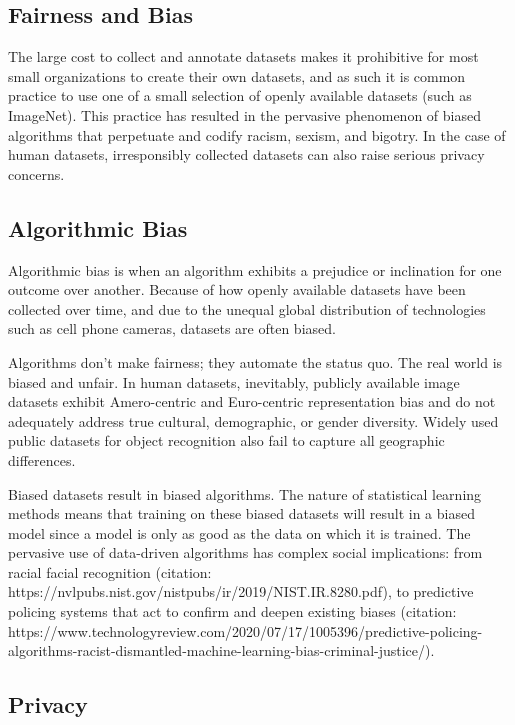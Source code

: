 \documentclass{article}
\begin{document}
\subsection{Fairness and Bias}

The large cost to collect and annotate datasets makes it prohibitive for most small organizations to create their own datasets, and as such it is common practice to use one of a small selection of openly available datasets (such as ImageNet). This practice has resulted in the pervasive phenomenon of biased algorithms that perpetuate and codify racism, sexism, and bigotry. In the case of human datasets, irresponsibly collected datasets can also raise serious privacy concerns. 

\subsection{Algorithmic Bias}

Algorithmic bias is when an algorithm exhibits a prejudice or inclination for one outcome over another. Because of how openly available datasets have been collected over time, and due to the unequal global distribution of technologies such as cell phone cameras, datasets are often biased. 

Algorithms don’t make fairness; they automate the status quo. The real world is biased and unfair. In human datasets, inevitably, publicly available image datasets exhibit Amero-centric and Euro-centric representation bias and do not adequately address true cultural, demographic, or gender diversity\cite{shankar2017classification}. Widely used public datasets for object recognition also fail to capture all geographic differences\cite{DBLP:journals/corr/abs-1906-02659}. 

Biased datasets result in biased algorithms. The nature of statistical learning methods means that training on these biased datasets will result in a biased model since a model is only as good as the data on which it is trained. The pervasive use of data-driven algorithms has complex social implications: from racial facial recognition (citation: https://nvlpubs.nist.gov/nistpubs/ir/2019/NIST.IR.8280.pdf), to predictive policing systems that act to confirm and deepen existing biases (citation: https://www.technologyreview.com/2020/07/17/1005396/predictive-policing-algorithms-racist-dismantled-machine-learning-bias-criminal-justice/). 
\subsection{Privacy}
\end{document}
